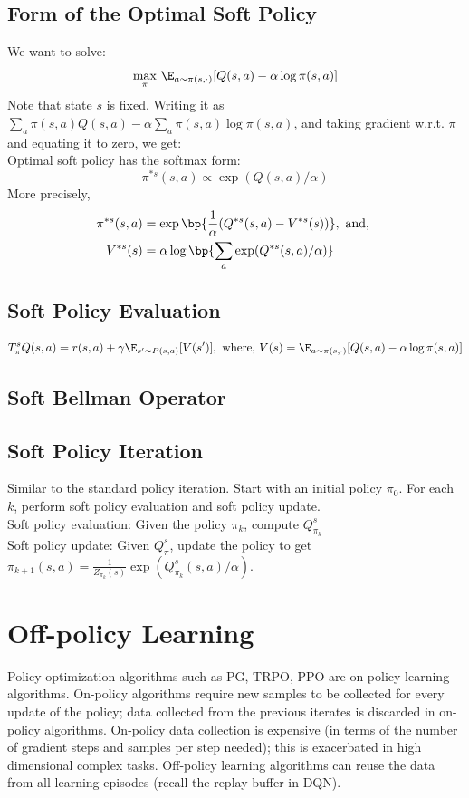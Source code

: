 \subsection{Form of the Optimal Soft Policy}
We want to solve:
\[
  \max_{\pi} \, \E_{a \sim \pi(s, \cdot)}[Q(s,a) - \alpha \log \pi(s, a)]
\]
Note that state $s$ is fixed. Writing it as $\sum_a \pi(s, a) Q(s, a) - \alpha \sum_{a} \pi(s, a) \log \pi(s, a)$, and taking gradient w.r.t. $\pi$ and equating it to zero, we get: \\ 

\noindent Optimal soft policy has the softmax form:
\[
  \pi^{*s} (s, a) \propto \exp(Q(s, a)/\alpha)
\]
More precisely,
\begin{align*}
  \pi^{*s}(s,a) &= \exp \bp{\frac{1}{\alpha}(Q^{*s}(s, a) - V^{*s}(s))}, \text{ and, } \\ 
  V^{*s}(s) &= \alpha \log \bp{\sum_{a} \exp(Q^{*s}(s,a)/\alpha)}
\end{align*}

\subsection{Soft Policy Evaluation}
\[
  T_{\pi}^s Q(s,a) = r(s,a) + \gamma \E_{s^{\prime}\sim P(s,a)}[V(s^{\prime})], \text{ where, } V(s) = \E_{a\sim\pi(s,\cdot)} [Q(s,a) - \alpha \log \pi(s, a)] 
\] 
\subsection{Soft Bellman Operator}

\subsection{Soft Policy Iteration}
Similar to the standard policy iteration. Start with an initial policy $\pi_0$. For each $k$, 
perform soft policy evaluation and soft policy update. \\ 

\noindent Soft policy evaluation: Given the policy $\pi_k$, compute $Q_{\pi_k}^s$ \\ 

\noindent Soft policy update: Given $Q_\pi^s$, update the policy to get $\pi_{k+1}(s,a) = \frac{1}{Z_{\pi_k}(s)}\exp(Q_{\pi_k}^s(s,a) / \alpha)$.

\section{Off-policy Learning}
Policy optimization algorithms such as PG, TRPO, PPO are on-policy learning algorithms. On-policy algorithms require new samples to be collected for every update 
of the policy; data collected from the previous iterates is discarded in on-policy algorithms. On-policy data collection is expensive (in terms 
of the number of gradient steps and samples per step needed); this is exacerbated in high dimensional complex tasks. Off-policy learning algorithms can reuse the 
data from all learning episodes (recall the replay buffer in DQN). \\ 

